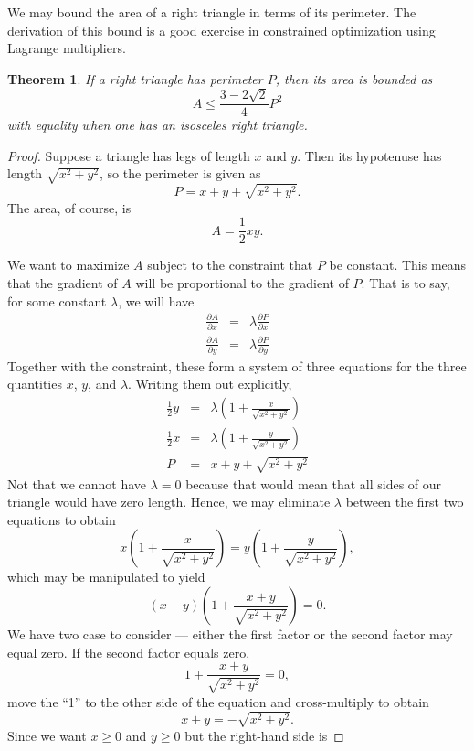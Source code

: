 \documentclass[12pt]{article}
\newtheorem{theorem}{Theorem}
\begin{document}
We may bound the area of a right triangle in terms of its perimeter.
The derivation of this bound is a good exercise in constrained 
optimization using Lagrange multipliers.

\begin{theorem}
If a right triangle has perimeter $P$, then its area is bounded as
\[
A \le \frac{3 - 2 \sqrt{2}}{4} P^2
\]
with equality when one has an isosceles right triangle.
\end{theorem}

\begin{proof}
Suppose a triangle has legs of length $x$ and $y$.  Then its hypotenuse
has length $\sqrt{x^2 + y^2}$, so the perimeter is given as
 \[ P = x + y + \sqrt{x^2 + y^2} .\]
The area, of course, is
 \[ A = \frac{1}{2} x y .\]

We want to maximize $A$ subject to the constraint that $P$ be constant.
This means that the gradient of $A$ will be proportional to the gradient
of $P$.  That is to say, for some constant $\lambda$, we will have
\begin{eqnarray*}
\frac{\partial A}{\partial x} &=& \lambda \frac{\partial P}{\partial x} \\
\frac{\partial A}{\partial y} &=& \lambda \frac{\partial P}{\partial y}
\end{eqnarray*}
Together with the constraint, these form a system of three equations
for the three quantities $x$, $y$, and $\lambda$.  Writing them out
explicitly,
\begin{eqnarray*}
\frac{1}{2} y &=& \lambda \left( 1 + \frac{x}{\sqrt{x^2 + y^2}} \right) \\
\frac{1}{2} x &=& \lambda \left( 1 + \frac{y}{\sqrt{x^2 + y^2}} \right) \\
P &=& x + y + \sqrt{x^2 + y^2}
\end{eqnarray*} 
Not that we cannot have $\lambda = 0$ because that would mean that all
sides of our triangle would have zero length.  Hence, we may eliminate 
$\lambda$ between the first two equations to obtain
\[
x \left( 1 + \frac{x}{\sqrt{x^2 + y^2}} \right) =
y \left( 1 + \frac{y}{\sqrt{x^2 + y^2}} \right),
\]
which may be manipulated to yield
\[
(x - y) \left( 1 + \frac{x+y}{\sqrt{x^2 + y^2}} \right) = 0.
\]
We have two case to consider --- either the first factor or the second
factor may equal zero.  If the second factor equals zero,
\[
1 + \frac{x+y}{\sqrt{x^2 + y^2}} = 0,
\]
move the ``1'' to the other side of the equation and cross-multiply
to obtain
\[
x + y = - \sqrt{x^2 + y^2}.
\]
Since we want $x \ge 0$ and $y \ge 0$ but the right-hand side is

\end{proof}
\end{document}
